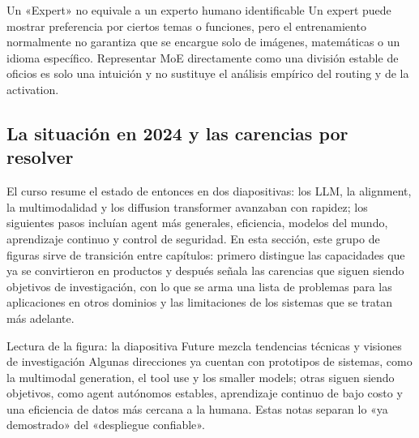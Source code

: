 \begin{warningbox}{Un «Expert» no equivale a un experto humano identificable}
Un expert puede mostrar preferencia por ciertos temas o funciones, pero el entrenamiento normalmente no garantiza que se encargue solo de imágenes, matemáticas o un idioma específico. Representar MoE directamente como una división estable de oficios es solo una intuición y no sustituye el análisis empírico del routing y de la activation.
\end{warningbox}

\subsection{La situación en 2024 y las carencias por resolver}

El curso resume el estado de entonces en dos diapositivas: los LLM, la alignment, la multimodalidad y los diffusion transformer avanzaban con rapidez; los siguientes pasos incluían agent más generales, eficiencia, modelos del mundo, aprendizaje continuo y control de seguridad. En esta sección, este grupo de figuras sirve de transición entre capítulos: primero distingue las capacidades que ya se convirtieron en productos y después señala las carencias que siguen siendo objetivos de investigación, con lo que se arma una lista de problemas para las aplicaciones en otros dominios y las limitaciones de los sistemas que se tratan más adelante.



\begin{knowledgebox}{Lectura de la figura: la diapositiva Future mezcla tendencias técnicas y visiones de investigación}
Algunas direcciones ya cuentan con prototipos de sistemas, como la multimodal generation, el tool use y los smaller models; otras siguen siendo objetivos, como agent autónomos estables, aprendizaje continuo de bajo costo y una eficiencia de datos más cercana a la humana. Estas notas separan lo «ya demostrado» del «despliegue confiable».
\end{knowledgebox}



